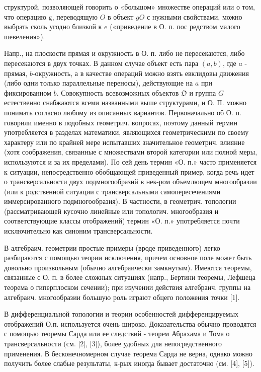 \documentclass[10pt]{article}
\begin{document}
структурой, позволяющей говорить о «большом» множестве операций или о том, что операцию $\mathrm{g}$, переводящую $O$ в объект $g O$ с нужными свойствами, можно выбрать сколь угодно близкой к $e$ («приведение в О. п. пос редством малого шевеления»).



Напр., на плоскости прямая и окружность в О. п. либо не пересекаются, либо пересекаются в двух точках. В данном случае объект есть пара $(a, b)$, где $a$ - прямая, $b$-окружность, а в качестве операций можно взять евклидовы движения (либо одни только параллельные переносы), действующие на $a$ при фиксированном $b$. Совокупность всевозможных объектов $\mathfrak{O}$ и группа $G$ естественно снабжаются всеми названными выше структурами, и О. П. можно понимать согласно любому из описанных вариантов. Первоначально об О. п. говорили именно в подобных геометрич. вопросах, поэтому данный термин употребляется в разделах математики, являющихся геометрическими по своему характеру или по крайней мере испытавших значительное геометрич. влияние (хотя соображения, связанные с множествами второй категории или полной меры, используются и за их пределами). По сей день термин «О. п.» часто применяется к ситуации, непосредственно обобщающей приведенный пример, когда речь идет о трансверсальности двух подмногообразий в нек-ром объемлющем многообразии (или к родственной ситуации с трансверсальными самопересечениями иммерсированного подмногообразия). В частности, в геометрич. топологии (рассматривающей кусочно линейные или топологич. многообразия и соответствующие классы отображений) термин «О. п.» употребляется почти исключительно как синоним трансверсальности.



В алгебраич. геометрии простые примеры (вроде приведенного) легко разбираются с помощью теории исключения, причем основное поле может быть довольно произвольным (обычно алгебраически замкнутым). Имеются теоремы, связанные с О. п. в более сложных ситуациях (напр., Бертини теоремы, Лефшеца теорема о гиперплоском сечении); при изучении действия алгебраич. группы на алгебраич. многообразии большую роль играют обцего положения точки [1].



В дифференциальной топологии и теории особенностей дифференцируемых отображений О.п. используется очень широко. Доказательства обычно проводятся с помощью теоремы Сарда или ее следствий - теорем Абрахама и Тома о трансверсальности (см. [2], [3]), более удобных для непосредственного применения. В бесконечномерном случае теорема Сарда не верна, однако можно получить более слабые результаты, к-рых иногда бывает достаточно (см. [4], [5]).
\end{document}
